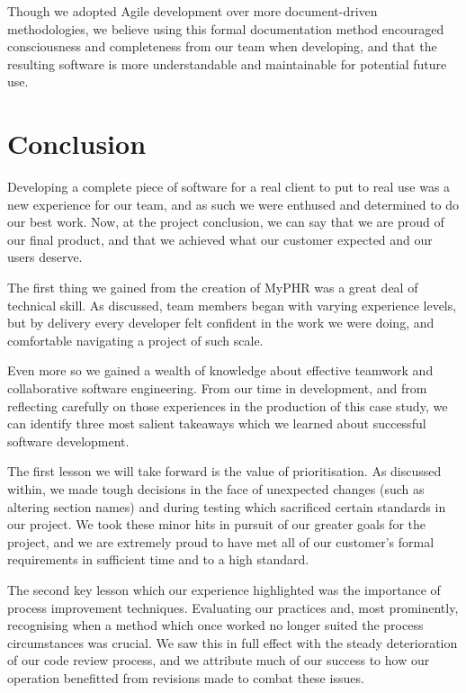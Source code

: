 \documentclass{l3proj}
\begin{document}
Though we adopted Agile development over more document-driven methodologies, we believe using this formal documentation method encouraged consciousness and completeness from our team when developing, and that the resulting software is more understandable and maintainable for potential future use.


\section{Conclusion} \label{sec:4}
Developing a complete piece of software for a real client to put to real use was a new experience for our team, and as such we were enthused and determined to do our best work. Now, at the project conclusion, we can say that we are proud of our final product, and that we achieved what our customer expected and our users deserve.

The first thing we gained from the creation of MyPHR was a great deal of technical skill. As discussed, team members began with varying experience levels, but by delivery every developer felt confident in the work we were doing, and comfortable navigating a project of such scale.

Even more so we gained a wealth of knowledge about effective teamwork and collaborative software engineering. From our time in development, and from reflecting carefully on those experiences in the production of this case study, we can identify three most salient takeaways which we learned about successful software development.

The first lesson we will take forward is the value of prioritisation. As discussed within, we made tough decisions in the face of unexpected changes (such as altering section names) and during testing which sacrificed certain standards in our project. We took these minor hits in pursuit of our greater goals for the project, and we are extremely proud to have met all of our customer's formal requirements in sufficient time and to a high standard. 

The second key lesson which our experience highlighted was the importance of process improvement techniques. Evaluating our practices and, most prominently, recognising when a method which once worked no longer suited the process circumstances was crucial. We saw this in full effect with the steady deterioration of our code review process, and we attribute much of our success to how our operation benefitted from revisions made to combat these issues. 
\end{document}
